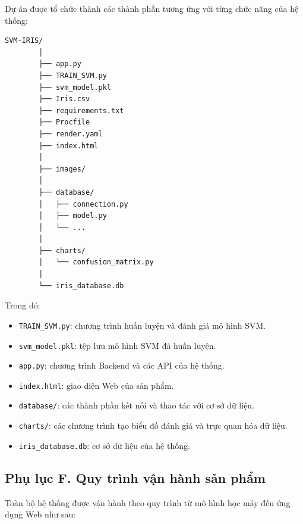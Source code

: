 \documentclass[14pt]{extarticle}
\begin{document}
	\noindent
	Dự án được tổ chức thành các thành phần tương ứng với từng chức năng
	của hệ thống:
	\newpage 
	\begin{lstlisting}[language={},
		numbers=none,
		frame=single,
		basicstyle=\ttfamily\small]
		SVM-IRIS/
		│
		├── app.py
		├── TRAIN_SVM.py
		├── svm_model.pkl
		├── Iris.csv
		├── requirements.txt
		├── Procfile
		├── render.yaml
		├── index.html
		│
		├── images/
		│
		├── database/
		│   ├── connection.py
		│   ├── model.py
		│   └── ...
		│
		├── charts/
		│   └── confusion_matrix.py
		│
		└── iris_database.db
	\end{lstlisting}
	
	\noindent
	Trong đó:
	
	\begin{itemize}[leftmargin=*]
		\item \texttt{TRAIN\_SVM.py}: chương trình huấn luyện và đánh giá
		mô hình SVM.
		
		\item \texttt{svm\_model.pkl}: tệp lưu mô hình SVM đã huấn luyện.
		
		\item \texttt{app.py}: chương trình Backend và các API của hệ thống.
		
		\item \texttt{index.html}: giao diện Web của sản phẩm.
		
		\item \texttt{database/}: các thành phần kết nối và thao tác với
		cơ sở dữ liệu.
		
		\item \texttt{charts/}: các chương trình tạo biểu đồ đánh giá và
		trực quan hóa dữ liệu.
		
		\item \texttt{iris\_database.db}: cơ sở dữ liệu của hệ thống.
	\end{itemize}
	
	
	
	
	\subsection*{Phụ lục F. Quy trình vận hành sản phẩm}
	
	\noindent
	Toàn bộ hệ thống được vận hành theo quy trình từ mô hình học máy đến
	ứng dụng Web như sau:
	
\end{document}
